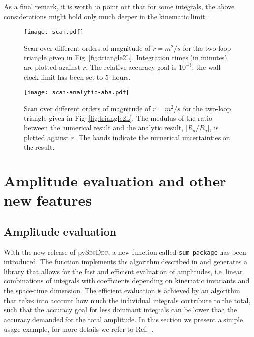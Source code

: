 \documentclass[Physsubmission, Phys]{SciPost}
\newcommand{\pysecdec}{py{\textsc{SecDec}}}
\begin{document}
As a final remark, it is worth to point out that for some integrals, the above considerations might hold only much deeper in the kinematic limit.

\begin{figure}
\begin{center}
\texttt{[image: scan.pdf]} 
    \caption{Scan over different orders of magnitude of $r = m^2/s$ for the two-loop triangle given in Fig~\ref{fig:triangle2L}. Integration times (in minutes) are plotted against $r$. The relative accuracy goal is $10^{-3}$; the wall clock limit has been set to 5~hours.}
\label{fig:Scan}
\end{center}
\end{figure}

\begin{figure}
\begin{center}
\texttt{[image: scan-analytic-abs.pdf]} 
\caption{Scan over different orders of magnitude of $r = m^2/s$ for the two-loop triangle given in Fig~\ref{fig:triangle2L}. The modulus of the ratio between the numerical result and the analytic result, $|R_{n}/R_{a}|$, is plotted against $r$. The bands indicate the numerical uncertainties on the result.}
\label{fig:ScanAnalytic}
\end{center}
\end{figure}

\section{Amplitude evaluation and other new features}
\label{sec:2}

\subsection{Amplitude evaluation}
\label{subsec:21}
With the new release of \pysecdec{}, a new function called \texttt{sum\_package} has been introduced. The function implements the algorithm described in \cite{Kerner:2016msj} and generates a library that allows for the fast and efficient evaluation of amplitudes, i.e. linear combinations of integrals with coefficients depending on kinematic invariants and the space-time dimension.
The efficient evaluation is achieved by an algorithm that takes into account how much the individual integrals contribute to the total, such that the accuracy goal for less dominant integrals can be lower than the accuracy demanded for the total amplitude.
In this section we present a simple usage example, for more details we refer to Ref.~\cite{Heinrich:2021dbf}.
\end{document}
